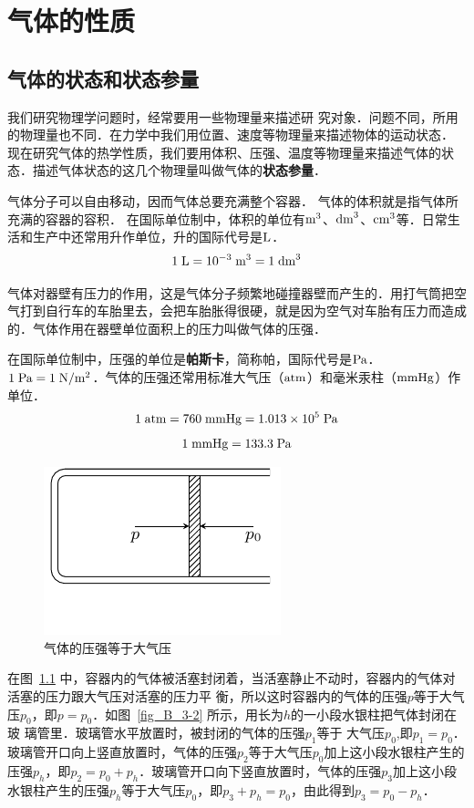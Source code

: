 \chapter{气体的性质}\label{chapter-properties-of-gases}


\section{气体的状态和状态参量}
我们研究物理学问题时，经常要用一些物理量来描述研
究对象．问题不同，所用的物理量也不同．在力学中我们用位置、速度等物理量来描述物体的运动状态．
现在研究气体的热学性质，我们要用体积、压强、温度等物理量来描述气体的状态．描述气体状态的这几个物理量叫做气体的\textbf{状态参量}．

气体分子可以自由移动，因而气体总要充满整个容器．
气体的体积就是指气体所充满的容器的容积．
在国际单位制中，体积的单位有$ \text{m}^3 $、$\text{dm}^3$、$ \text{cm}^3$等．日常生活和生产中还常用升作单位，升的国际代号是$\text{L}$．
\[1 \;\text{L} =10^{-3} \;\text{m}^3 =1 \;\text{dm}^3\]

气体对器壁有压力的作用，这是气体分子频繁地碰撞器壁而产生的．用打气筒把空气打到自行车的车胎里去，会把车胎胀得很硬，就是因为空气对车胎有压力而造成的．气体作用在器壁单位面积上的压力叫做气体的压强．

在国际单位制中，压强的单位是\textbf{帕斯卡}，简称帕，国际代号是$\text{Pa}$．
$1 \;\text{Pa}=1 \;\text{N}/\text{m}^2$．气体的压强还常用标准大气压（$\text{atm}$）和毫米汞柱（$\text{mmHg}$）作单位．
\[1 \;\text{atm} =760 \;\text{mmHg}=1.013\times 10^5 \;\text{Pa} \]
\[1 \;\text{mmHg} =133.3 \;\text{Pa} \]

\begin{figure}[htbp]
    \centering
    \includegraphics{fig/B/3-1.pdf}
    \caption{气体的压强等于大气压}\label{fig_B_3-1}
\end{figure}



在图~\ref{fig_B_3-1} 中，容器内的气体被活塞封闭着，当活塞静止不动时，容器内的气体对活塞的压力跟大气压对活塞的压力平
衡，所以这时容器内的气体的压强$p$等于大气压$p_0$，即$p=p_0$．如图~\ref{fig_B_3-2} 所示，用长为$h$的一小段水银柱把气体封闭在玻
璃管里．玻璃管水平放置时，被封闭的气体的压强$p_1$等于
大气压$p_0$,即$p_1=p_0$．玻璃管开口向上竖直放置时，气体的压强$p_2$等于大气压$p_0$加上这小段水银柱产生的压强$p_h$，即$p_2=p_0+p_h$．玻璃管开口向下竖直放置时，气体的压强$p_3$加上这小段水银柱产生的压强$p_h$等于大气压$p_0$，即$p_3+p_h=p_0$，由此得到$p_3=p_0-p_h$．

